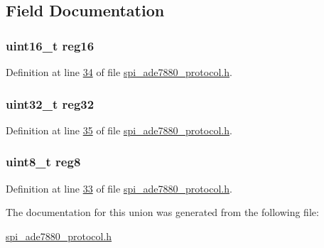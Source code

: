 \subsection{Field Documentation}
\hypertarget{a00034_a0c22d234d52e616d449a8c264bf2030b}{
\subsubsection[{reg16}]{\setlength{\rightskip}{0pt plus 5cm}uint16\-\_\-t reg16}}\label{db/df3/a00034_a0c22d234d52e616d449a8c264bf2030b}


Definition at line \hyperlink{a00041_source_l00034}{34} of file \hyperlink{a00041_source}{spi\-\_\-ade7880\-\_\-protocol.\-h}.

\hypertarget{a00034_a83e2be8d3feb1bcbc286bfaae10ac552}{
\subsubsection[{reg32}]{\setlength{\rightskip}{0pt plus 5cm}uint32\-\_\-t reg32}}\label{db/df3/a00034_a83e2be8d3feb1bcbc286bfaae10ac552}


Definition at line \hyperlink{a00041_source_l00035}{35} of file \hyperlink{a00041_source}{spi\-\_\-ade7880\-\_\-protocol.\-h}.

\hypertarget{a00034_a90b3f782e917edca7101e7803a3773b7}{
\subsubsection[{reg8}]{\setlength{\rightskip}{0pt plus 5cm}uint8\-\_\-t reg8}}\label{db/df3/a00034_a90b3f782e917edca7101e7803a3773b7}


Definition at line \hyperlink{a00041_source_l00033}{33} of file \hyperlink{a00041_source}{spi\-\_\-ade7880\-\_\-protocol.\-h}.



The documentation for this union was generated from the following file\-:\begin{DoxyCompactItemize}
\item 
\hyperlink{a00041}{spi\-\_\-ade7880\-\_\-protocol.\-h}\end{DoxyCompactItemize}
